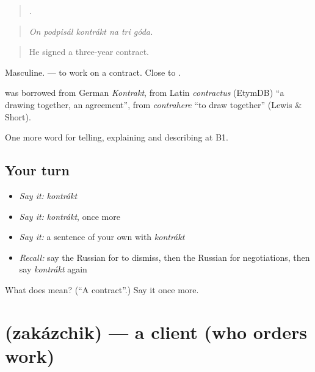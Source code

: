 \begin{quote}
     .
\end{quote}

\begin{quote}
\emph{On podpisál kontrákt na tri góda.}
\end{quote}

\begin{quote}
He signed a three-year contract.
\end{quote}

Masculine. \emph{  } — to work on a contract. Close to \emph{}.

\begin{cousinweb}
\textbf{} was borrowed from German \emph{Kontrakt}, from Latin \emph{contractus} (EtymDB) \textquotedblleft{}a drawing together, an agreement\textquotedblright{}, from \emph{contrahere} \textquotedblleft{}to draw together\textquotedblright{} (Lewis \& Short).
\end{cousinweb}

\begin{grammarlens}[title={What you've built}]
One more word for telling, explaining and describing at B1.
\end{grammarlens}

\subsection*{Your turn}
\begin{itemize}
\raggedright
  \item \emph{Say it:} \emph{kontrákt}
  \item \emph{Say it:} \emph{kontrákt}, once more
  \item \emph{Say it:} a sentence of your own with \emph{kontrákt}
  \item \emph{Recall:} say the Russian for to dismiss, then the Russian for negotiations, then say \emph{kontrákt} again
\end{itemize}

\begin{tcolorbox}[breakable,colback=teal!4,colframe=teal!35!black,title={Before you move on}]
What does  mean? (\textquotedblleft{}A contract\textquotedblright{}.) Say it once more.
\end{tcolorbox}
\section[\texorpdfstring{\ru{заказчик} (zakázchik)}{заказчик (zakázchik)}]{ (zakázchik) — a client (who orders work)}

